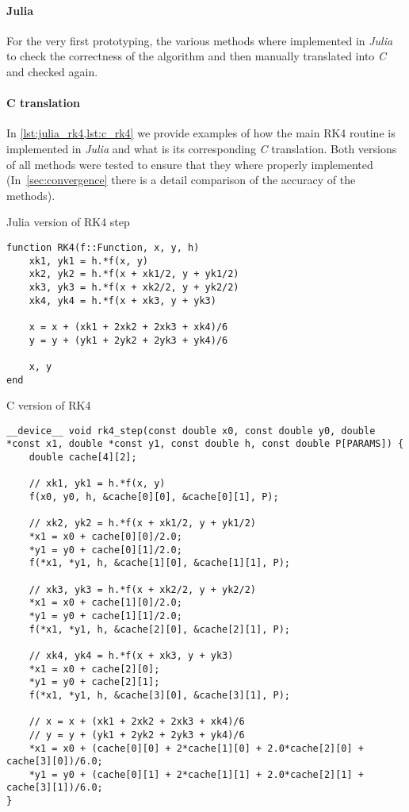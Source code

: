 \paragraph{Julia}
For the very first prototyping, the various methods where implemented in \emph{Julia} to check the correctness of the algorithm and then manually translated into \emph{C} and checked again.

\paragraph{C translation}

In \cref{lst:julia_rk4,lst:c_rk4} we provide examples of how the main RK4 routine is implemented in \emph{Julia} and what is its corresponding \emph{C} translation. Both versions of all methods were tested to ensure that they where properly implemented (In~\cref{sec:convergence} there is a detail comparison of the accuracy of the methods).


\begin{listing}[H]
    \caption{Julia version of RK4 step}
    \label{lst:julia_rk4}
\begin{verbatim}
function RK4(f::Function, x, y, h)
    xk1, yk1 = h.*f(x, y)
    xk2, yk2 = h.*f(x + xk1/2, y + yk1/2)
    xk3, yk3 = h.*f(x + xk2/2, y + yk2/2)
    xk4, yk4 = h.*f(x + xk3, y + yk3)

    x = x + (xk1 + 2xk2 + 2xk3 + xk4)/6
    y = y + (yk1 + 2yk2 + 2yk3 + yk4)/6

    x, y
end
\end{verbatim}
\end{listing}

\begin{listing}[H]
    \caption{C version of RK4}
    \label{lst:c_rk4}
\begin{verbatim}
__device__ void rk4_step(const double x0, const double y0, double *const x1, double *const y1, const double h, const double P[PARAMS]) {
    double cache[4][2];

    // xk1, yk1 = h.*f(x, y)
    f(x0, y0, h, &cache[0][0], &cache[0][1], P);

    // xk2, yk2 = h.*f(x + xk1/2, y + yk1/2)
    *x1 = x0 + cache[0][0]/2.0;
    *y1 = y0 + cache[0][1]/2.0;
    f(*x1, *y1, h, &cache[1][0], &cache[1][1], P);

    // xk3, yk3 = h.*f(x + xk2/2, y + yk2/2)
    *x1 = x0 + cache[1][0]/2.0;
    *y1 = y0 + cache[1][1]/2.0;
    f(*x1, *y1, h, &cache[2][0], &cache[2][1], P);

    // xk4, yk4 = h.*f(x + xk3, y + yk3)
    *x1 = x0 + cache[2][0];
    *y1 = y0 + cache[2][1];
    f(*x1, *y1, h, &cache[3][0], &cache[3][1], P);

    // x = x + (xk1 + 2xk2 + 2xk3 + xk4)/6
    // y = y + (yk1 + 2yk2 + 2yk3 + yk4)/6
    *x1 = x0 + (cache[0][0] + 2*cache[1][0] + 2.0*cache[2][0] + cache[3][0])/6.0;
    *y1 = y0 + (cache[0][1] + 2*cache[1][1] + 2.0*cache[2][1] + cache[3][1])/6.0;
}
\end{verbatim}
\end{listing}

